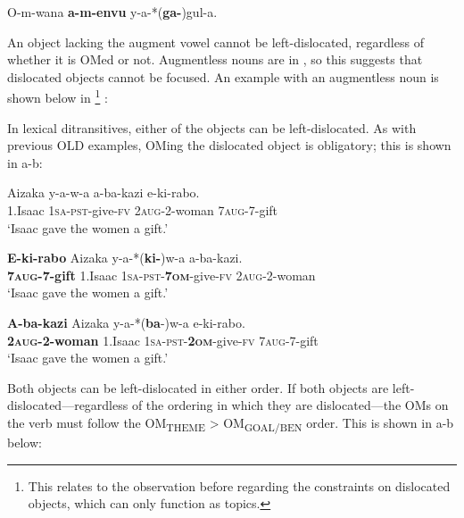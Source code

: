 \documentclass[output=paper
,newtxmath
,modfonts
,nonflat]{langsci/langscibook}
\begin{document}
\ex\label{ex:ranero:14b} O-m-wana \textbf{a-m-envu}   y-a-*(\textbf{ga-})gul-a.
\z
\z

An object lacking the augment vowel cannot be left-dislocated, regardless of whether it is OMed or not. Augmentless nouns are in  \citep{Hyman1993}, so this suggests that dislocated objects cannot be focused. An example with an augmentless noun is shown below in \footnote{This relates to the observation before regarding the  constraints on dislocated objects, which can only function as topics.} :

\z

In lexical ditransitives, either of the objects can be left-dislocated. As with previous OLD examples, OMing the dislocated object is obligatory; this is shown in a-b:

\ea\label{ex:ranero:16}
\gll Aizaka y-a-w-a           a-ba-kazi     e-ki-rabo.\\
1.Isaac \textsc{1sa-pst}{}-give-\textsc{fv} 2\textsc{aug}{}-2-woman 7\textsc{aug}{}-7-gift\\
\glt ‘Isaac gave the women a gift.’
\z

\ea\label{ex:ranero:17}
\ea\label{ex:ranero:17a}
\gll \textbf{E-ki-rabo}    Aizaka y-a-*(\textbf{ki-})w-a        a-ba-kazi.\\
\textbf{7\textsc{aug}}\textbf{{}-7-gift} 1.Isaac \textsc{1sa-pst}{}-\textbf{7\textsc{om}}{}-give-\textsc{fv} 2\textsc{aug}{}-2-woman\\
\glt ‘Isaac gave the women a gift.’

\ex\label{ex:ranero:17b}
\gll \textbf{A-ba-kazi}          Aizaka y-a-*(\textbf{ba}{}-)w-a              e-ki-rabo.\\
\textbf{2\textsc{aug}}\textbf{{}-2-woman} 1.Isaac \textsc{1sa-pst}{}-\textbf{2\textsc{om}}{}-give-\textsc{fv} 7\textsc{aug}{}-7-gift\\
\glt ‘Isaac gave the women a gift.’
\z
\z

Both objects can be left-dislocated in either order. If both objects are left-dislocated—regardless of the ordering in which they are dislocated—the OMs on the verb must follow the OM\textsubscript{THEME} > OM\textsubscript{GOAL/BEN} order. This is shown in a-b below:
\end{document}
